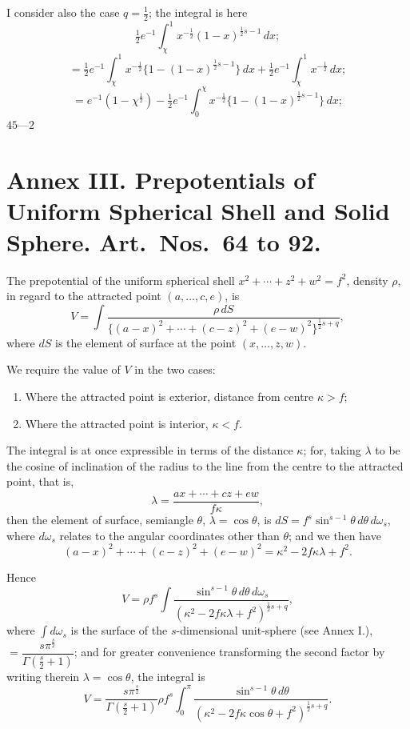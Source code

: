 \documentclass[11pt,a4paper]{book}
\begin{document}
\begin{art}\label{art:59}
I consider also the case $q = \tfrac{1}{2}$; the integral is here
\[
\tfrac{1}{2}e^{-1} \int_\chi^1 x^{-\frac{1}{2}}(1-x)^{\frac{1}{2}s-1}\, dx;
\]
\[
= \tfrac{1}{2}e^{-1} \int_\chi^1 x^{-\frac{1}{2}}\{1-(1-x)^{\frac{1}{2}s-1}\}\, dx + \tfrac{1}{2}e^{-1}\int_\chi^1 x^{-\frac{1}{2}}\, dx;
\]
\[
= e^{-1}(1-\chi^{\frac{1}{2}}) - \tfrac{1}{2}e^{-1}\int_0^\chi x^{-\frac{1}{2}}\{1-(1-x)^{\frac{1}{2}s-1}\}\, dx;
\]
$45$---$2$
\end{art}

\newpage
\section*{Annex III. Prepotentials of Uniform Spherical Shell and Solid Sphere. Art.\ Nos.\ 64 to 92.}

\begin{art}\label{art:60}
The prepotential of the uniform spherical shell $x^2 + \cdots + z^2 + w^2 = f^2$, density $\rho$, in regard to the attracted point $(a, \ldots, c, e)$, is
\[
V = \int \frac{\rho \, dS}{\{(a-x)^2 + \cdots + (c-z)^2 + (e-w)^2\}^{\frac{1}{2}s+q}},
\]
where $dS$ is the element of surface at the point $(x, \ldots, z, w)$.

We require the value of $V$ in the two cases:
\begin{enumerate}[label=\arabic*.]
\item Where the attracted point is exterior, distance from centre $\kappa > f$;
\item Where the attracted point is interior, $\kappa < f$.
\end{enumerate}
\end{art}

\begin{art}\label{art:61}
The integral is at once expressible in terms of the distance $\kappa$; for, taking $\lambda$ to be the cosine of inclination of the radius to the line from the centre to the attracted point, that is,
\[
\lambda = \frac{ax + \cdots + cz + ew}{f\kappa},
\]
then the element of surface, semiangle $\theta$, $\lambda = \cos\theta$, is $dS = f^s \sin^{s-1}\theta \, d\theta \, d\omega_s$, where $d\omega_s$ relates to the angular coordinates other than $\theta$; and we then have
\[
(a-x)^2 + \cdots + (c-z)^2 + (e-w)^2 = \kappa^2 - 2f\kappa\lambda + f^2.
\]

Hence
\[
V = \rho f^s \int \frac{\sin^{s-1}\theta \, d\theta \, d\omega_s}{(\kappa^2 - 2f\kappa\lambda + f^2)^{\frac{1}{2}s+q}},
\]
where $\int d\omega_s$ is the surface of the $s$-dimensional unit-sphere (see Annex I.), $= \dfrac{s\pi^{\frac{s}{2}}}{\Gamma(\frac{s}{2}+1)}$; and for greater convenience transforming the second factor by writing therein $\lambda = \cos\theta$, the integral is
\[
V = \frac{s\pi^{\frac{s}{2}}}{\Gamma(\frac{s}{2}+1)} \rho f^s \int_0^\pi \frac{\sin^{s-1}\theta \, d\theta}{(\kappa^2 - 2f\kappa\cos\theta + f^2)^{\frac{1}{2}s+q}}.
\]
\end{art}
\end{document}
